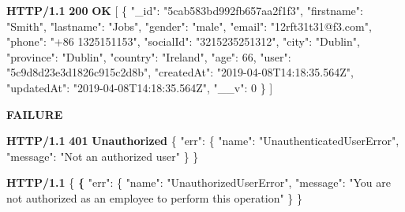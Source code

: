 \documentclass[
]{article}
\newenvironment{Shaded}{}{}
\newcommand{\DataTypeTok}[1]{\textcolor[rgb]{0.56,0.13,0.00}{#1}}
\newcommand{\DecValTok}[1]{\textcolor[rgb]{0.25,0.63,0.44}{#1}}
\newcommand{\ErrorTok}[1]{\textcolor[rgb]{1.00,0.00,0.00}{\textbf{#1}}}
\newcommand{\FunctionTok}[1]{\textcolor[rgb]{0.02,0.16,0.49}{#1}}
\newcommand{\OtherTok}[1]{\textcolor[rgb]{0.00,0.44,0.13}{#1}}
\newcommand{\StringTok}[1]{\textcolor[rgb]{0.25,0.44,0.63}{#1}}
\begin{document}
\begin{Shaded}
\begin{Highlighting}[]
\ErrorTok{HTTP/1.1} \ErrorTok{200} \ErrorTok{OK}
\OtherTok{[}
    \FunctionTok{\{}
        \DataTypeTok{"_id"}\FunctionTok{:} \StringTok{"5cab583bd992fb657aa2f1f3"}\FunctionTok{,}
        \DataTypeTok{"firstname"}\FunctionTok{:} \StringTok{"Smith"}\FunctionTok{,}
        \DataTypeTok{"lastname"}\FunctionTok{:} \StringTok{"Jobs"}\FunctionTok{,}
        \DataTypeTok{"gender"}\FunctionTok{:} \StringTok{"male"}\FunctionTok{,}
        \DataTypeTok{"email"}\FunctionTok{:} \StringTok{"12rft31t31@f3.com"}\FunctionTok{,}
        \DataTypeTok{"phone"}\FunctionTok{:} \StringTok{"+86 1325151153"}\FunctionTok{,}
        \DataTypeTok{"socialId"}\FunctionTok{:} \StringTok{"3215235251312"}\FunctionTok{,}
        \DataTypeTok{"city"}\FunctionTok{:} \StringTok{"Dublin"}\FunctionTok{,}
        \DataTypeTok{"province"}\FunctionTok{:} \StringTok{"Dublin"}\FunctionTok{,}
        \DataTypeTok{"country"}\FunctionTok{:} \StringTok{"Ireland"}\FunctionTok{,}
        \DataTypeTok{"age"}\FunctionTok{:} \DecValTok{66}\FunctionTok{,}
        \DataTypeTok{"user"}\FunctionTok{:} \StringTok{"5c9d8d23e3d1826c915c2d8b"}\FunctionTok{,}
        \DataTypeTok{"createdAt"}\FunctionTok{:} \StringTok{"2019-04-08T14:18:35.564Z"}\FunctionTok{,}
        \DataTypeTok{"updatedAt"}\FunctionTok{:} \StringTok{"2019-04-08T14:18:35.564Z"}\FunctionTok{,}
        \DataTypeTok{"__v"}\FunctionTok{:} \DecValTok{0}
    \FunctionTok{\}}
\OtherTok{]}
\end{Highlighting}
\end{Shaded}

\textbf{FAILURE}

\begin{Shaded}
\begin{Highlighting}[]
\ErrorTok{HTTP/1.1} \ErrorTok{401} \ErrorTok{Unauthorized}
\FunctionTok{\{}
    \DataTypeTok{"err"}\FunctionTok{:} \FunctionTok{\{}
        \DataTypeTok{"name"}\FunctionTok{:} \StringTok{"UnauthenticatedUserError"}\FunctionTok{,}
        \DataTypeTok{"message"}\FunctionTok{:} \StringTok{"Not an authorized user"}
    \FunctionTok{\}}
\FunctionTok{\}}
\end{Highlighting}
\end{Shaded}

\begin{Shaded}
\begin{Highlighting}[]
\ErrorTok{HTTP/1.1} \FunctionTok{\{}
\ErrorTok{\{}
    \DataTypeTok{"err"}\FunctionTok{:} \FunctionTok{\{}
        \DataTypeTok{"name"}\FunctionTok{:} \StringTok{"UnauthorizedUserError"}\FunctionTok{,}
        \DataTypeTok{"message"}\FunctionTok{:} \StringTok{"You are not authorized as an employee to perform this operation"}
    \FunctionTok{\}}
\FunctionTok{\}}
\end{Highlighting}
\end{Shaded}
\end{document}
